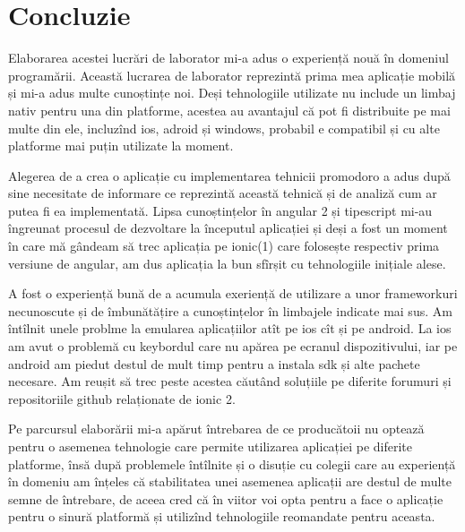 \section*{Concluzie}

Elaborarea acestei lucrări de laborator mi-a adus o experiență nouă în domeniul programării. Această lucrarea de laborator reprezintă prima mea aplicație mobilă și mi-a adus multe cunoștințe noi. Deși tehnologiile utilizate nu include un limbaj nativ pentru una din platforme, acestea au avantajul că pot fi distribuite pe mai multe din ele, incluzînd ios, adroid și windows, probabil e compatibil și cu alte platforme mai puțin utilizate la moment. 

Alegerea de a crea o aplicație cu implementarea tehnicii promodoro a adus după sine necesitate de informare ce reprezintă această tehnică și de analiză cum ar putea fi ea implementată. Lipsa cunoștințelor în angular 2 și tipescript mi-au îngreunat procesul de dezvoltare la începutul aplicației și deși a fost un moment în care mă gândeam să trec aplicația pe ionic(1) care folosește respectiv prima versiune de angular, am dus aplicația la bun sfîrșit cu tehnologiile inițiale alese. 

A fost o experiență bună de a acumula exeriență de utilizare a unor frameworkuri necunoscute și de îmbunătățire a cunoștințelor în limbajele indicate mai sus. 
Am întîlnit unele problme la emularea aplicațiilor atît pe ios cît și pe android. La ios am avut o problemă cu keybordul care nu apărea pe ecranul dispozitivului, iar pe android am piedut destul de mult timp pentru a instala sdk și alte pachete necesare. Am reușit să trec peste acestea căutând soluțiile pe diferite forumuri și repositoriile github relaționate de ionic 2.

Pe parcursul elaborării mi-a apărut întrebarea de ce producătoii nu optează pentru o asemenea tehnologie care permite utilizarea aplicației pe diferite platforme, însă după problemele întîlnite și o disuție cu colegii care au experiență în domeniu am înțeles că stabilitatea unei asemenea aplicații are destul de multe semne de întrebare, de aceea cred că în viitor voi opta pentru a face o aplicație pentru o sinură platformă și utilizînd tehnologiile reomandate pentru aceasta.

\clearpage